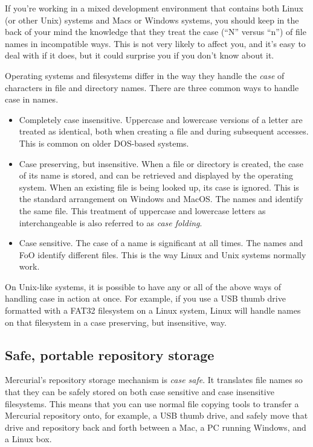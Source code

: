 If you're working in a mixed development environment that contains
both Linux (or other Unix) systems and Macs or Windows systems, you
should keep in the back of your mind the knowledge that they treat the
case (``N'' versus ``n'') of file names in incompatible ways.  This is
not very likely to affect you, and it's easy to deal with if it does,
but it could surprise you if you don't know about it.

Operating systems and filesystems differ in the way they handle the
\emph{case} of characters in file and directory names.  There are
three common ways to handle case in names.
\begin{itemize}
\item Completely case insensitive.  Uppercase and lowercase versions
  of a letter are treated as identical, both when creating a file and
  during subsequent accesses.  This is common on older DOS-based
  systems.
\item Case preserving, but insensitive.  When a file or directory is
  created, the case of its name is stored, and can be retrieved and
  displayed by the operating system.  When an existing file is being
  looked up, its case is ignored.  This is the standard arrangement on
  Windows and MacOS.  The names  and 
  identify the same file.  This treatment of uppercase and lowercase
  letters as interchangeable is also referred to as \emph{case
    folding}.
\item Case sensitive.  The case of a name is significant at all times.
  The names  and {FoO} identify different files.  This
  is the way Linux and Unix systems normally work.
\end{itemize}

On Unix-like systems, it is possible to have any or all of the above
ways of handling case in action at once.  For example, if you use a
USB thumb drive formatted with a FAT32 filesystem on a Linux system,
Linux will handle names on that filesystem in a case preserving, but
insensitive, way.

\subsection{Safe, portable repository storage}

Mercurial's repository storage mechanism is \emph{case safe}.  It
translates file names so that they can be safely stored on both case
sensitive and case insensitive filesystems.  This means that you can
use normal file copying tools to transfer a Mercurial repository onto,
for example, a USB thumb drive, and safely move that drive and
repository back and forth between a Mac, a PC running Windows, and a
Linux box.

